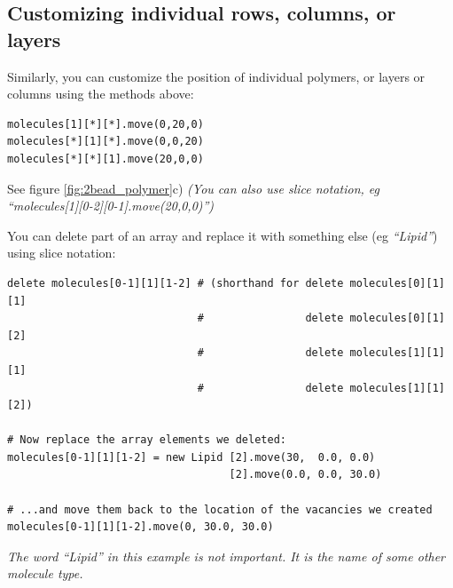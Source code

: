 \documentclass[11pt]{article}
\begin{document}
\subsection{Customizing individual rows, columns, or layers}
Similarly, you can customize the position of individual polymers, 
or layers or columns using the methods above:
\begin{verbatim}
molecules[1][*][*].move(0,20,0)
molecules[*][1][*].move(0,0,20)
molecules[*][*][1].move(20,0,0)
\end{verbatim}
See figure \ref{fig:2bead_polymer}c)
\textit{(You can also use slice notation, 
         eg ``molecules[1][0-2][0-1].move(20,0,0)'')}

You can delete part of an array and replace it with something else
(eg \textit{``Lipid''})
using slice notation:
\begin{verbatim}
delete molecules[0-1][1][1-2] # (shorthand for delete molecules[0][1][1]
                              #                delete molecules[0][1][2]
                              #                delete molecules[1][1][1]
                              #                delete molecules[1][1][2])

# Now replace the array elements we deleted:
molecules[0-1][1][1-2] = new Lipid [2].move(30,  0.0, 0.0)
                                   [2].move(0.0, 0.0, 30.0)

# ...and move them back to the location of the vacancies we created
molecules[0-1][1][1-2].move(0, 30.0, 30.0)
\end{verbatim}
\textit{The word ``Lipid'' in this example is not important.
        It is the name of some other molecule type.}
\end{document}
